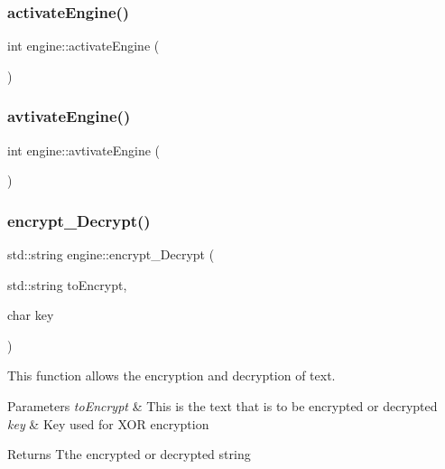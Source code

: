 \subsubsection{\texorpdfstring{activate\+Engine()}{activateEngine()}}
{\footnotesize\ttfamily int engine\+::activate\+Engine (\begin{DoxyParamCaption}{ }\end{DoxyParamCaption})}

\mbox{\label{namespaceengine_a640e5ff4dec2d87df4ea2243128e33c8}} 
\subsubsection{\texorpdfstring{avtivate\+Engine()}{avtivateEngine()}}
{\footnotesize\ttfamily int engine\+::avtivate\+Engine (\begin{DoxyParamCaption}{ }\end{DoxyParamCaption})}

\mbox{\label{namespaceengine_a809f71235f1a2a58ea738d4276b795c9}} 
\subsubsection{\texorpdfstring{encrypt\+\_\+\+Decrypt()}{encrypt\_Decrypt()}}
{\footnotesize\ttfamily std\+::string engine\+::encrypt\+\_\+\+Decrypt (\begin{DoxyParamCaption}\item[{std\+::string}]{to\+Encrypt,  }\item[{char}]{key }\end{DoxyParamCaption})}



This function allows the encryption and decryption of text. 


\begin{DoxyParams}{Parameters}
{\em to\+Encrypt} & This is the text that is to be encrypted or decrypted \\
\hline
{\em key} & Key used for X\+OR encryption \\
\hline
\end{DoxyParams}
\begin{DoxyReturn}{Returns}
Tthe encrypted or decrypted string 
\end{DoxyReturn}
\mbox{\label{namespaceengine_afdfa37a571a13db9a156c8a6813fa3e5}} 
